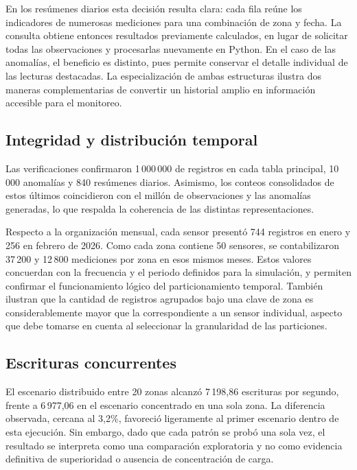 \documentclass[conference]{IEEEtran}
\begin{document}
En los resúmenes diarios esta decisión resulta clara: cada fila reúne los indicadores de numerosas mediciones para una combinación de zona y fecha. La consulta obtiene entonces resultados previamente calculados, en lugar de solicitar todas las observaciones y procesarlas nuevamente en Python. En el caso de las anomalías, el beneficio es distinto, pues permite conservar el detalle individual de las lecturas destacadas. La especialización de ambas estructuras ilustra dos maneras complementarias de convertir un historial amplio en información accesible para el monitoreo.

\subsection{Integridad y distribución temporal}

Las verificaciones confirmaron 1\,000\,000 de registros en cada tabla principal, 10\,000 anomalías y 840 resúmenes diarios. Asimismo, los conteos consolidados de estos últimos coincidieron con el millón de observaciones y las anomalías generadas, lo que respalda la coherencia de las distintas representaciones.

Respecto a la organización mensual, cada sensor presentó 744 registros en enero y 256 en febrero de 2026. Como cada zona contiene 50 sensores, se contabilizaron 37\,200 y 12\,800 mediciones por zona en esos mismos meses. Estos valores concuerdan con la frecuencia y el periodo definidos para la simulación, y permiten confirmar el funcionamiento lógico del particionamiento temporal. También ilustran que la cantidad de registros agrupados bajo una clave de zona es considerablemente mayor que la correspondiente a un sensor individual, aspecto que debe tomarse en cuenta al seleccionar la granularidad de las particiones.

\subsection{Escrituras concurrentes}

El escenario distribuido entre 20 zonas alcanzó 7\,198,86 escrituras por segundo, frente a 6\,977,06 en el escenario concentrado en una sola zona. La diferencia observada, cercana al 3,2\%, favoreció ligeramente al primer escenario dentro de esta ejecución. Sin embargo, dado que cada patrón se probó una sola vez, el resultado se interpreta como una comparación exploratoria y no como evidencia definitiva de superioridad o ausencia de concentración de carga.
\end{document}
